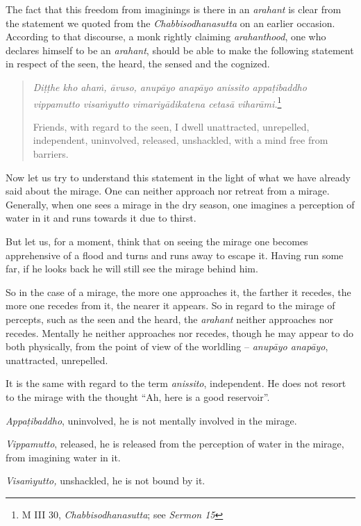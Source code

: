 \enlargethispage{\baselineskip}

The fact that this freedom from imaginings is there in an \emph{arahant} is clear from the statement we quoted from the \emph{Chabbisodhanasutta} on an earlier occasion. According to that discourse, a monk rightly claiming \emph{arahanthood}, one who declares himself to be an \emph{arahant}, should be able to make the following statement in respect of the seen, the heard, the sensed and the cognized.

\begin{quote}
\emph{Diṭṭhe kho ahaṁ, āvuso, anupāyo anapāyo anissito appaṭibaddho vippamutto visaṁyutto vimariyādikatena cetasā viharāmi.}\footnote{M III 30, \emph{Chabbisodhanasutta}; see \emph{Sermon 15}}

Friends, with regard to the seen, I dwell unattracted, unrepelled, independent, uninvolved, released, unshackled, with a mind free from barriers.
\end{quote}

Now let us try to understand this statement in the light of what we have already said about the mirage. One can neither approach nor retreat from a mirage. Generally, when one sees a mirage in the dry season, one imagines a perception of water in it and runs towards it due to thirst.

But let us, for a moment, think that on seeing the mirage one becomes apprehensive of a flood and turns and runs away to escape it. Having run some far, if he looks back he will still see the mirage behind him.

So in the case of a mirage, the more one approaches it, the farther it recedes, the more one recedes from it, the nearer it appears. So in regard to the mirage of percepts, such as the seen and the heard, the \emph{arahant} neither approaches nor recedes. Mentally he neither approaches nor recedes, though he may appear to do both physically, from the point of view of the worldling -- \emph{anupāyo anapāyo}, unattracted, unrepelled.

It is the same with regard to the term \emph{anissito}, independent. He does not resort to the mirage with the thought ``Ah, here is a good reservoir''.

\emph{Appaṭibaddho}, uninvolved, he is not mentally involved in the mirage.

\emph{Vippamutto}, released, he is released from the perception of water in the mirage, from imagining water in it.

\emph{Visaṁyutto,} unshackled, he is not bound by it.


